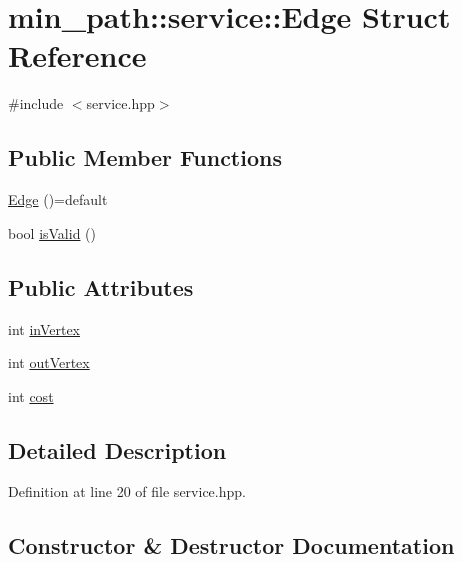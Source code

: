 \hypertarget{structmin__path_1_1service_1_1_edge}{}\section{min\+\_\+path\+:\+:service\+:\+:Edge Struct Reference}
\label{structmin__path_1_1service_1_1_edge}


{\ttfamily \#include $<$service.\+hpp$>$}

\subsection*{Public Member Functions}
\begin{DoxyCompactItemize}
\item 
\hyperlink{structmin__path_1_1service_1_1_edge_a1a92aa2befef939e9fca80e90e317e1e}{Edge} ()=default
\item 
bool \hyperlink{structmin__path_1_1service_1_1_edge_a610fccbed0fe90d3c31b9052066d0480}{is\+Valid} ()
\end{DoxyCompactItemize}
\subsection*{Public Attributes}
\begin{DoxyCompactItemize}
\item 
int \hyperlink{structmin__path_1_1service_1_1_edge_ae5f860082c48acb267ddf2bbed3d762e}{in\+Vertex}
\item 
int \hyperlink{structmin__path_1_1service_1_1_edge_a7162f7cb4b4bfa81225f2a6be16b770a}{out\+Vertex}
\item 
int \hyperlink{structmin__path_1_1service_1_1_edge_ab46c0741b12aad4e05a46a854cd8500f}{cost}
\end{DoxyCompactItemize}


\subsection{Detailed Description}


Definition at line 20 of file service.\+hpp.



\subsection{Constructor \& Destructor Documentation}
